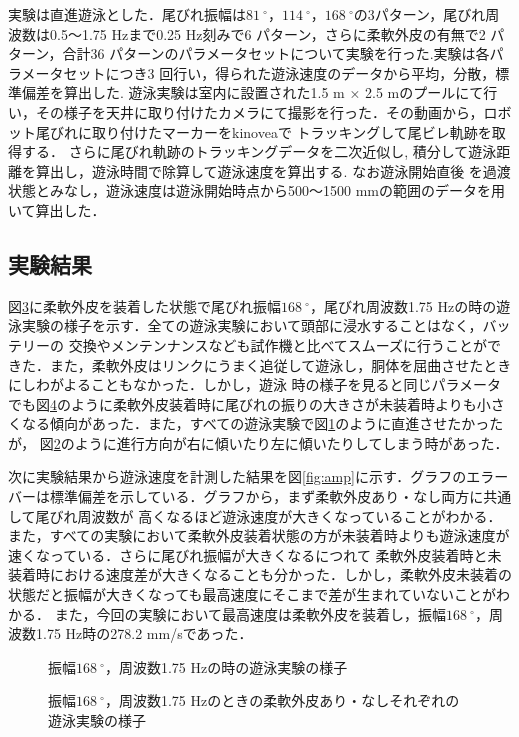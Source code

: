 実験は直進遊泳とした．尾びれ振幅は$81\:^\circ$，$114\:^\circ$，$168\:^\circ$の3パターン，尾びれ周波数は0.5～1.75 Hzまで0.25 Hz刻みで6 パターン，さらに柔軟外皮の有無で2 パターン，合計36 
パターンのパラメータセットについて実験を行った.実験は各パラメータセットにつき3 回行い，得られた遊泳速度のデータから平均，分散，標準偏差を算出した.
遊泳実験は室内に設置された1.5 m × 2.5 mのプールにて行い，その様子を天井に取り付けたカメラにて撮影を行った．その動画から，ロボット尾びれに取り付けたマーカーをkinoveaで
トラッキングして尾ビレ軌跡を取得する．
さらに尾びれ軌跡のトラッキングデータを二次近似し, 積分して遊泳距離を算出し，遊泳時間で除算して遊泳速度を算出する. なお遊泳開始直後
を過渡状態とみなし，遊泳速度は遊泳開始時点から500～1500 mmの範囲のデータを用いて算出した．

\subsection{実験結果}
図\ref{fig:test_swim}に柔軟外皮を装着した状態で尾びれ振幅$168\:^\circ$，尾びれ周波数1.75 Hzの時の遊泳実験の様子を示す．全ての遊泳実験において頭部に浸水することはなく，バッテリーの
交換やメンテンナンスなども試作機と比べてスムーズに行うことができた．また，柔軟外皮はリンクにうまく追従して遊泳し，胴体を屈曲させたときにしわがよることもなかった．しかし，遊泳
時の様子を見ると同じパラメータでも図\ref{fig:kukkyoku}のように柔軟外皮装着時に尾びれの振りの大きさが未装着時よりも小さくなる傾向があった．また，すべての遊泳実験で図\ref{fig:str}のように直進させたかったが，
図\ref{fig:right}のように進行方向が右に傾いたり左に傾いたりしてしまう時があった．

次に実験結果から遊泳速度を計測した結果を図\ref{fig:amp}に示す．グラフのエラーバーは標準偏差を示している．グラフから，まず柔軟外皮あり・なし両方に共通して尾びれ周波数が
高くなるほど遊泳速度が大きくなっていることがわかる．また，すべての実験において柔軟外皮装着状態の方が未装着時よりも遊泳速度が速くなっている．さらに尾びれ振幅が大きくなるにつれて
柔軟外皮装着時と未装着時における速度差が大きくなることも分かった．しかし，柔軟外皮未装着の状態だと振幅が大きくなっても最高速度にそこまで差が生まれていないことがわかる．
また，今回の実験において最高速度は柔軟外皮を装着し，振幅$168\:^\circ$，周波数1.75 Hz時の278.2 mm/sであった．

\begin{figure}[htbp]
   \centering  
   \begin{subfigure}[b]{1\linewidth}
       \centering
       \label{fig:str}
   \end{subfigure}
   \begin{subfigure}[b]{1\linewidth}
       \centering
       \label{fig:right}
   \end{subfigure}
   \caption{振幅$168\:^\circ$，周波数1.75 Hzの時の遊泳実験の様子}
   \label{fig:test_swim}
\end{figure}
\begin{figure}[htbp]
    \centering
    \caption{振幅$168\:^\circ$，周波数1.75 Hzのときの柔軟外皮あり・なしそれぞれの遊泳実験の様子}
    \label{fig:kukkyoku}
\end{figure}

